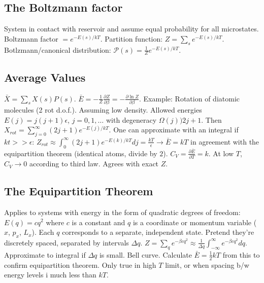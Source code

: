\documentclass[11pt,twocolumn]{amsart}
\begin{document}
\subsection{The Boltzmann factor}
System in contact with reservoir and assume equal probability for all microstates. Boltzmann factor $=e^{-E(s)/kT}$. Partition function: $Z = \sum_s e^{-E(s)/kT}$. Botlzmann/canonical distribution: $\mathcal{P}(s) = \frac{1}{Z}e^{-E(s)/kT}$.

\subsection{Average Values}
$\bar{X} = \sum_s X(s) P(s)$. $\bar{E} = -\frac{1}{Z} \frac{\partial Z}{\partial \beta} = -\frac{\partial \ln Z}{\partial \beta}$. Example: Rotation of diatomic molecules (2 rot d.o.f.). Assuming low density. Allowed energies $E(j) = j(j +1)\epsilon$, $j=0,1,\dots$ with degeneracy $\Omega(j) ) 2j + 1$. Then $X_{rot} = \sum_{j=0}^\infty (2j+1) e^{-E(j)/kT}$. One can approximate with an integral if $kt >> \epsilon$: $Z_{rot} \approx \int_0^\infty (2j+1) e^{-E(k)/kT}dj = \frac{kT}{\epsilon} \rightarrow \bar{E} = kT$ in agreement with the equipartition theorem (identical atoms, divide by $2$). $C_V = \frac{\partial \bar{E}}{\partial T} = k$. At low $T$, $C_V \rightarrow 0$ according to third law. Agrees with exact $Z$. 

\subsection{The Equipartition Theorem}
Applies to systems with energy in the form of quadratic degrees of freedom: $E(q) = cq^2$ where $c$ is a constant and $q$ is a coordinate or momentum variable ($x$, $p_x$, $L_x$). Each $q$ corresponds to a separate, independent state. Pretend they're discretely spaced, separated by intervals $\Delta q$. $Z=\sum_q e^{-\beta cq^2} \approx \frac{1}{\Delta q} \int_{-\infty}^\infty e^{-\beta cq^2} dq$. Approximate to integral if $\Delta q$ is small. Bell curve. Calculate $\bar{E}=\frac{1}{2}kT$ from this to confirm equipartition theorem. Only true in high $T$ limit, or when spacing b/w energy levels i much less than $kT$.
\end{document}
